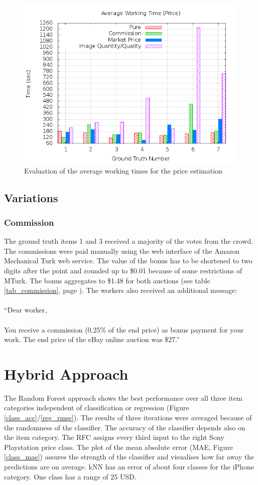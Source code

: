 \begin{figure}
\centering
\includegraphics[scale=0.55]{images/plots/crowdsourcing/plot_time_price.png}
\caption{Evaluation of the average working times for the price estimation}
\label{crowdsourcing_time_price}
\end{figure}
\subsection{Variations}
\subsubsection{Commission}
The ground truth items 1 and 3 received a majority of the votes from the crowd. The commissions were paid manually using the web interface of the Amazon Mechanical Turk web service. The value of the bonus has to be shortened to two digits after the point and rounded up to \$0.01 because of some restrictions of MTurk. The bonus aggregates to \$1.48 for both auctions (see table \ref{tab_commission}, page \pageref{tab_commission}). The workers also received an additional message:\\\\
``Dear worker, \\\\
You receive a commission (0.25\% of the end price) as bonus payment for your work. The end price of the eBay online auction was \$27.''
\section{Hybrid Approach}
The Random Forest approach shows the best performance over all three item categories independent of classification or regression (Figure \ref{class_acc}/\ref{reg_rmse}). The results of three iterations were averaged because of the randomness of the classifier. The accuracy of the classifier depends also on the item category. The RFC assigns every third input to the right Sony Playstation price class. The plot of the mean absolute error (MAE, Figure \ref{class_mae}) assures the strength of the classifier and visualises how far away the predictions are on average. kNN has an error of about four classes for the iPhone category. One class has a range of 25 USD.

